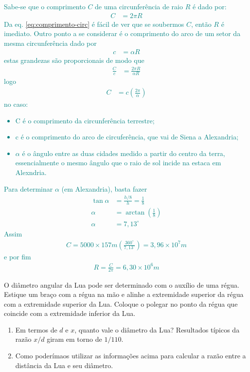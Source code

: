 \begin{sol}
	\textcolor{teal} {
		Sabe-se que o comprimento $C$ de uma circunferência de raio $R$ é dado por:
		\begin{align}
			C&=2\pi R
			\label{eq:comprimento-circ}
		\end{align}
		Da eq. \eqref{eq:comprimento-circ} é fácil de ver que se soubermos $C$, então $R$ é imediato. Outro ponto a se considerar é o comprimento do arco de um setor da mesma circunferência dado por
		\begin{align}
			c&=\alpha R
			\label{eq:comprimento-setor}
		\end{align}
		estas grandezas são proporcionais de modo que
		\begin{align}
			\frac{C}{c}&=\frac{2\pi R}{\alpha R}
		\end{align}
		logo
		\begin{align}
			C&=c\left(\frac{2\pi}{\alpha}\right)
		\end{align}
		no caso:
		\begin{itemize}
			\item C é o comprimento da circunferência terrestre;
			\item c é o comprimento do arco de circuferência, que vai de Siena a Alexandria;
			\item $\alpha$ é o ângulo entre as duas cidades medido a partir do centro da terra, essencialmente o mesmo ângulo que o raio de sol incide na estaca em Alexndria. 
		\end{itemize}
		Para determinar $\alpha$ (em Alexandria), basta fazer
		\begin{align}
			\tan \alpha&=\frac{h/8}{h}=\frac{1}{8} \nonumber \\
			\alpha&=\arctan\left(\frac{1}{8}\right) \nonumber \\
			\alpha&=7,13^{\circ}
		\end{align}
		Assim
		\begin{align}
			C=5000\times 157m\left(\frac{360^{\circ}}{7,13^{\circ}}\right)=3,96\times 10^{7}m
		\end{align}
		e por fim
		\begin{align}
			R=\frac{C}{2\pi}=6,30\times 10^{6}m
		\end{align}
	}
\end{sol}
\begin{prob}
	O diâmetro angular da Lua pode ser determinado com o auxílio de uma régua. Estique um braço com a régua na mão e alinhe a extremidade superior da régua com a extremidade superior da Lua. Coloque o polegar no ponto da régua que coincide com a extremidade inferior da Lua.
	\begin{enumerate}[label=\alph *)]
		\item Em termos de $d$ e $x$, quanto vale o diâmetro da Lua? Resultados típicos da razão $x/d$ giram em torno de $1/110$.
		\item Como poderímaos utilizar as informações acima para calcular a razão entre a distância da Lua e seu diâmetro.
	\end{enumerate}
\end{prob}
